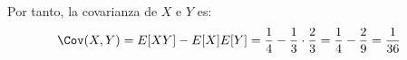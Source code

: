 \begin{ejercicio}
\begin{enumerate}
        Por tanto, la covarianza de $X$ e $Y$ es:
        \begin{align*}
            \Cov(X,Y)&=E[XY]-E[X]E[Y]
            = \dfrac{1}{4}-\dfrac{1}{3}\cdot\dfrac{2}{3}
            = \dfrac{1}{4}-\dfrac{2}{9}
            = \dfrac{1}{36}
        \end{align*}
    \end{enumerate}
\end{ejercicio}